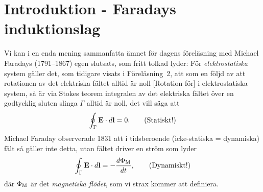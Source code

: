 
\section{Introduktion - Faradays induktionslag}
Vi kan i en enda mening sammanfatta {\"a}mnet f{\"o}r dagens
f{\"o}rel{\"a}sning
med Michael Faradays (1791--1867)  egen
slutsats, som fritt tolkad lyder:
\noindent
F{\"o}r {\it elektrostatiska}  system g{\"a}ller det, som
tidigare visats i F{\"o}rel{\"a}sning~2, att som en f{\"o}ljd av att rotationen
av det elektriska f{\"a}ltet alltid {\"a}r noll [Rotation f{\"o}r]  i elektrostatiska system, s{\aa} {\"a}r via Stokes
teorem  integralen av det elektriska f{\"a}ltet {\"o}ver en
godtycklig sluten slinga $\Gamma$ alltid {\"a}r noll, det vill s{\"a}ga
att
$$
  \oint_{\Gamma}{\bf E}\cdot d{\bf l}=0.
  \qquad\hbox{(Statiskt!)}
$$
Michael Faraday observerade 1831 att i tidsberoende (icke-statiska = dynamiska)
f{\"a}lt s{\aa} g{\"a}ller inte detta, utan f{\"a}ltet driver en str{\"o}m som
lyder
$$
  \oint_{\Gamma}{\bf E}\cdot d{\bf l}=-{{d\Phi_{\rm M}}\over{dt}},
  \qquad\hbox{(Dynamiskt!)}
$$
d{\"a}r $\Phi_{\rm M}$ {\"a}r det {\it magnetiska fl{\"o}det}, 
 som vi strax kommer att definiera.
